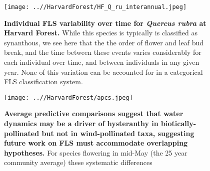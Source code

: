 \documentclass{article}
\begin{document}

 \begin{figure}[ht]
        \centering
          \texttt{[image: ..//HarvardForest/HF\_Q\_ru\_interannual.jpeg]}
          \caption{\textbf{Individual FLS variability over time for \textit{Quercus rubra} at Harvard Forest.} While this species is typically is classified as synanthous, we see here that the the order of flower and leaf bud break, and the time between these events varies considerably for each individual over time, and between individuals in any given year. None of this variation can be accounted for in a categorical FLS classification system.}
        \label{fig:Quercus}
    \end{figure}
    

 \begin{figure}[ht]
        \centering
          \texttt{[image: ..//HarvardForest/apcs.jpeg]}
           \caption{\textbf{Average predictive comparisons suggest that water dynamics may be a driver of hysteranthy in biotically-pollinated but not in wind-pollinated taxa, suggesting future work on FLS must accommodate overlapping hypotheses.} For species flowering in mid-May (the 25 year community average) these systematic differences}
        \label{fig:apcs}
    \end{figure}
\end{document}
